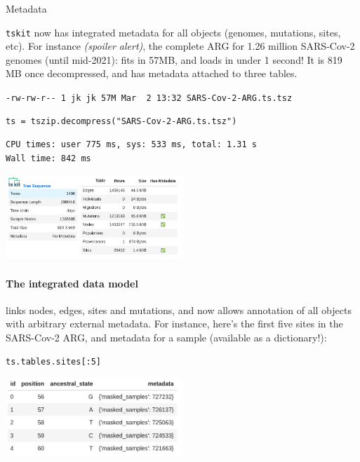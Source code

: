 \documentclass[landscape,a0paper,fontscale=0.4]{baposter}
\newcommand{\tskit}{{\texttt{tskit}}}
\begin{document}
\begin{poster}
\begin{posterbox}[name=inout,column=0,span=1,above=bottom]{Metadata}

    \tskit{} now has integrated metadata
    for all objects (genomes, mutations, sites, etc).
    For instance \emph{(spoiler alert)},
    the complete ARG for 1.26 million SARS-Cov-2 genomes (until mid-2021):
    fits in 57MB, and loads in under 1 second!
    It is 819 MB once decompressed, and has metadata attached to three tables.

{\scriptsize \verb|-rw-rw-r-- 1 jk jk 57M Mar  2 13:32 SARS-Cov-2-ARG.ts.tsz|}
\begin{verbatim}
ts = tszip.decompress("SARS-Cov-2-ARG.ts.tsz")
\end{verbatim}
{\scriptsize
\begin{verbatim}
CPU times: user 775 ms, sys: 533 ms, total: 1.31 s
Wall time: 842 ms
\end{verbatim}
}
\begin{center}
    \includegraphics[width=0.5\textwidth]{sc2_ts.png}
\end{center}

\paragraph{The integrated data model}
links nodes, edges, sites and mutations,
and now allows annotation of all objects with arbitrary external metadata.
For instance,
here's the first five sites in the SARS-Cov-2 ARG,
and
    metadata for a sample (available as a dictionary!):

\begin{multicols}{2}
\begin{verbatim}
ts.tables.sites[:5]
\end{verbatim}
\includegraphics[width=0.5\textwidth]{sc2_sites}


\end{multicols}
\end{posterbox}
\end{poster}
\end{document}

